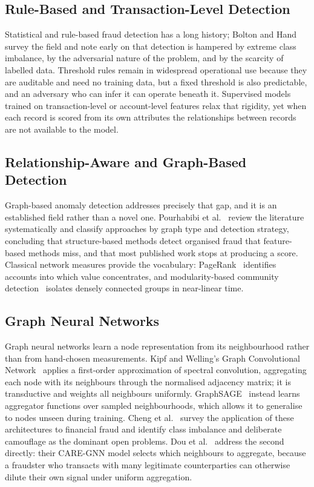 \subsection{Rule-Based and Transaction-Level Detection}
Statistical and rule-based fraud detection has a long history; Bolton and Hand~\cite{bolton2002} survey the field and note early on that detection is hampered by extreme class imbalance, by the adversarial nature of the problem, and by the scarcity of labelled data. Threshold rules remain in widespread operational use because they are auditable and need no training data, but a fixed threshold is also predictable, and an adversary who can infer it can operate beneath it. Supervised models trained on transaction-level or account-level features relax that rigidity, yet when each record is scored from its own attributes the relationships between records are not available to the model.

\subsection{Relationship-Aware and Graph-Based Detection}
Graph-based anomaly detection addresses precisely that gap, and it is an established field rather than a novel one. Pourhabibi et al.~\cite{pourhabibi2020} review the literature systematically and classify approaches by graph type and detection strategy, concluding that structure-based methods detect organised fraud that feature-based methods miss, and that most published work stops at producing a score. Classical network measures provide the vocabulary: PageRank~\cite{page1999} identifies accounts into which value concentrates, and modularity-based community detection~\cite{blondel2008} isolates densely connected groups in near-linear time.

\subsection{Graph Neural Networks}
Graph neural networks learn a node representation from its neighbourhood rather than from hand-chosen measurements. Kipf and Welling's Graph Convolutional Network~\cite{kipf2017} applies a first-order approximation of spectral convolution, aggregating each node with its neighbours through the normalised adjacency matrix; it is transductive and weights all neighbours uniformly. GraphSAGE~\cite{hamilton2017} instead learns aggregator functions over sampled neighbourhoods, which allows it to generalise to nodes unseen during training. Cheng et al.~\cite{cheng2025} survey the application of these architectures to financial fraud and identify class imbalance and deliberate camouflage as the dominant open problems. Dou et al.~\cite{dou2020} address the second directly: their CARE-GNN model selects which neighbours to aggregate, because a fraudster who transacts with many legitimate counterparties can otherwise dilute their own signal under uniform aggregation.

